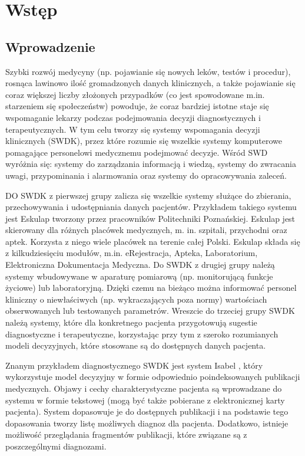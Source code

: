 \chapter{Wstęp}
\section{Wprowadzenie}

\begin{spacing}{1.5}

Szybki rozwój medycyny (np. pojawianie się nowych leków, testów i procedur), rosnąca lawinowo ilość gromadzonych danych klinicznych, a także pojawianie się coraz większej liczby złożonych przypadków (co jest spowodowane m.in. starzeniem się społeczeństw) powoduje, że coraz bardziej istotne staje się wspomaganie lekarzy podczas podejmowania decyzji diagnostycznych i terapeutycznych. W tym celu tworzy się systemy wspomagania decyzji klinicznych (SWDK), przez które rozumie się wszelkie systemy komputerowe pomagające personelowi medycznemu podejmować decyzje\cite{Musen06}. Wśród SWD wyróżnia się: systemy do zarządzania informacją i wiedzą, systemy do zwracania uwagi, przypominania i alarmowania oraz systemy do opracowywania zaleceń.

DO SWDK z pierwszej grupy zalicza się wszelkie systemy służące do zbierania, przechowywania i udostępniania danych pacjentów. Przykładem takiego systemu jest Eskulap tworzony przez pracowników Politechniki Poznańskiej. Eskulap jest skierowany dla różnych placówek medycznych, m. in. szpitali, przychodni oraz aptek. Korzysta z niego wiele placówek na terenie całej Polski. Eskulap składa się z kilkudziesięciu modułów, m.in. eRejestracja, Apteka, Laboratorium, Elektroniczna Dokumentacja Medyczna. Do SWDK z drugiej grupy należą systemy wbudowywane w aparaturę pomiarową (np. monitorującą funkcje życiowe) lub laboratoryjną. Dzięki czemu na bieżąco można informować personel kliniczny o niewłaściwych (np. wykraczających poza normy) wartościach obserwowanych lub testowanych parametrów. Wreszcie do trzeciej grupy SWDK należą systemy, które dla konkretnego pacjenta przygotowują sugestie diagnostyczne i terapeutyczne, korzystając przy tym z szeroko rozumianych modeli decyzyjnych, które stosowane są do dostępnych danych pacjenta. 

Znanym przykładem diagnostycznego SWDK jest system Isabel \cite{Isabel}, który wykorzystuje model decyzyjny w formie odpowiednio poindeksowanych publikacji medycznych. Objawy i cechy charakterystyczne pacjenta są wprowadzane do systemu w formie tekstowej (mogą być także pobierane z elektronicznej karty pacjenta). System dopasowuje je do dostępnych publikacji i na podstawie tego dopasowania tworzy listę możliwych diagnoz dla pacjenta. Dodatkowo, istnieje możliwość przeglądania fragmentów publikacji, które związane są z poszczególnymi diagnozami. 


\end{spacing}
